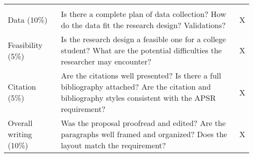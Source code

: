 \documentclass[11pt,]{article}
\theoremstyle{definition}
\theoremstyle{definition}
\theoremstyle{remark}
\begin{document}
\begin{longtable}[]{@{}lll@{}}
\begin{minipage}[t]{0.03\columnwidth}
\end{minipage}\tabularnewline
\begin{minipage}[t]{0.12\columnwidth}\raggedright\strut
Data (10\%)\strut
\end{minipage} & \begin{minipage}[t]{0.76\columnwidth}\raggedright\strut
Is there a complete plan of data collection? How do the data fit the
research design? Validations?\strut
\end{minipage} & \begin{minipage}[t]{0.03\columnwidth}\raggedright\strut
X\strut
\end{minipage}\tabularnewline
\begin{minipage}[t]{0.12\columnwidth}\raggedright\strut
Feasibility (5\%)\strut
\end{minipage} & \begin{minipage}[t]{0.76\columnwidth}\raggedright\strut
Is the research design a feasible one for a college student? What are
the potential difficulties the researcher may encounter?\strut
\end{minipage} & \begin{minipage}[t]{0.03\columnwidth}\raggedright\strut
X\strut
\end{minipage}\tabularnewline
\begin{minipage}[t]{0.12\columnwidth}\raggedright\strut
Citation (5\%)\strut
\end{minipage} & \begin{minipage}[t]{0.76\columnwidth}\raggedright\strut
Are the citations well presented? Is there a full bibliography attached?
Are the citation and bibliography styles consistent with the APSR
requirement?\strut
\end{minipage} & \begin{minipage}[t]{0.03\columnwidth}\raggedright\strut
X\strut
\end{minipage}\tabularnewline
\begin{minipage}[t]{0.12\columnwidth}\raggedright\strut
Overall writing (10\%)\strut
\end{minipage} & \begin{minipage}[t]{0.76\columnwidth}\raggedright\strut
Was the proposal proofread and edited? Are the paragraphs well framed
and organized? Does the layout match the requirement?\strut
\end{minipage} & \begin{minipage}[t]{0.03\columnwidth}\raggedright\strut
X\strut
\end{minipage}\tabularnewline
\bottomrule
\end{longtable}
\end{document}
